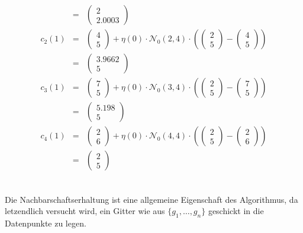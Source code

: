 \documentclass[DIN, pagenumber=false, fontsize=11pt, parskip=half]{scrartcl}
\begin{document}
\begin{enumerate}[label=(\alph*)]
\begin{eqnarray*}
                    &=& \begin{pmatrix} 2 \\ 2.0003 \end{pmatrix} \\
                c_2 (1) &=& \begin{pmatrix} 4 \\ 5 \end{pmatrix} + \eta(0) \cdot \mathcal{N}_0 (2, 4) \cdot \left(\begin{pmatrix} 2 \\ 5\end{pmatrix} - \begin{pmatrix} 4 \\ 5 \end{pmatrix}\right) \\
                    &=& \begin{pmatrix} 3.9662 \\ 5 \end{pmatrix} \\
                c_3 (1) &=& \begin{pmatrix} 7 \\ 5 \end{pmatrix} + \eta(0) \cdot \mathcal{N}_0 (3, 4) \cdot \left(\begin{pmatrix} 2 \\ 5\end{pmatrix} - \begin{pmatrix} 7 \\ 5 \end{pmatrix}\right) \\
                    &=& \begin{pmatrix} 5.198 \\ 5 \end{pmatrix} \\
                c_4 (1) &=& \begin{pmatrix} 2 \\ 6 \end{pmatrix} + \eta(0) \cdot \mathcal{N}_0 (4, 4) \cdot \left(\begin{pmatrix} 2 \\ 5\end{pmatrix} - \begin{pmatrix} 2 \\ 6 \end{pmatrix}\right) \\
                    &=& \begin{pmatrix} 2 \\ 5 \end{pmatrix} \\
            \end{eqnarray*}
    \end{enumerate}

    \subsection{}
    Die Nachbarschaftserhaltung ist eine allgemeine Eigenschaft des Algorithmus, da letzendlich versucht wird, ein Gitter wie aus $\{g_1, \ldots, g_n\}$ 
    geschickt in die Datenpunkte zu legen.
\end{document}
